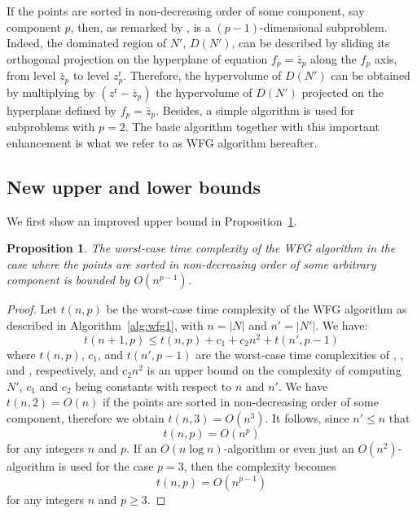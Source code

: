 \documentclass[a4paper,11pt]{article}
\newtheorem{proposition}[lemma]{Proposition}
\newcommand{\bz}{\bar{z}}
\newcommand{\BM}{z^{\text{r}}}
\begin{document}
If the points are sorted in non-decreasing order of some component, say component $p$, 
then, as remarked by \citet{WhiHinBarHub06},
 is a $(p-1)$-dimensional subproblem. 
Indeed, the dominated region of $N'$, $D(N')$, 
can be described by sliding its orthogonal projection on the hyperplane
of equation $f_p = \bz_p$ along the $f_p$ axis, 
from level $\bz_p$ to level $\BM_p$.
Therefore, the hypervolume of $D(N')$ can be obtained by multiplying by $(\BM - \bz_p)$
the hypervolume of $D(N')$ projected on the hyperplane defined by $f_p = \bz_p$.
Besides, a simple algorithm is used for subproblems with $p = 2$.
The basic algorithm together with this important enhancement 
is what we refer to as WFG algorithm hereafter.


\subsection{New upper and lower bounds}\label{sub:wfg_complex}

We first show an improved upper bound in Proposition~\ref{prop:wfg-complexity}.

\begin{proposition}\label{prop:wfg-complexity}
  The worst-case time complexity of the WFG algorithm 
  in the case where the points are sorted in non-decreasing order of some arbitrary component 
  is bounded by $O(n^{p-1})$.
\end{proposition}

\begin{proof}
  Let $t(n,p)$ be the worst-case time complexity of the WFG algorithm 
  as described in Algorithm~\ref{alg:wfg1}, 
  with $n=|N|$ and $n'=|N'|$. We have:
  $$t(n+1, p) \leq t(n,p) + c_1 + c_2 n^2 + t(n',p-1)$$
  where $t(n,p)$, $c_1$, and $t(n',p-1)$ are the 
  worst-case time complexities of , \WFG{$\{\bz\}$}, and , respectively,
  and $c_2 n^2$ is an upper bound on the complexity of computing $N'$,
  $c_1$ and $c_2$ being constants with respect to $n$ and $n'$.  
  We have $t(n,2) = O(n)$ if the points are sorted in non-decreasing order of some component, therefore we obtain 
  $t(n,3) = O(n^3)$. It follows, since $n'\leq n$ that 
  $$t(n,p) = O(n^p)$$
  for any integers $n$ and $p$.
  If an $O(n\log n)$-algorithm \citep{BeuFonLopPaqVah09} or even just
  an $O(n^2)$-algorithm is used for the case $p = 3$, then the complexity becomes
  $$t(n,p) = O(n^{p-1})$$
  for any integers $n$ and $p\geq 3$.
\end{proof}
\end{document}
